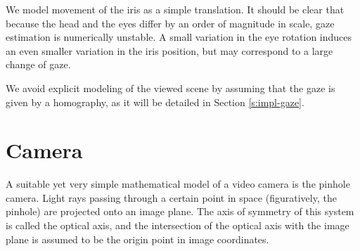 We model movement of the iris as a simple translation.
It should be clear that because the head and the eyes differ by an order of magnitude in scale, gaze estimation is numerically unstable.
A small variation in the eye rotation induces an even smaller variation in the iris position, but may correspond to a large change of gaze.

We avoid explicit modeling of the viewed scene by assuming that the gaze is given by a homography, as it will be detailed in Section \ref{s:impl-gaze}.

\section{Camera}

A suitable yet very simple mathematical model of a video camera is the pinhole camera.
Light rays passing through a certain point in space (figuratively, the pinhole) are projected onto an image plane.
The axis of symmetry of this system is called the optical axis, and the intersection of the optical axis with the image plane is assumed to be the origin point in image coordinates.


